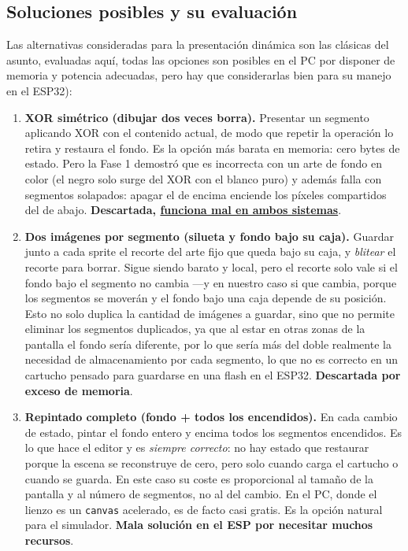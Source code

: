 \subsection{Soluciones posibles y su evaluación}
\label{subsec:SolucionesBorrado}

Las alternativas consideradas para la presentación dinámica son las clásicas del asunto, evaluadas aquí, todas las opciones son posibles en el PC por disponer de memoria y potencia adecuadas, pero hay que considerarlas bien para su manejo en el ESP32):

\begin{enumerate}
	\item \textbf{XOR simétrico (dibujar dos veces borra).} Presentar un segmento aplicando XOR con el contenido actual, de modo que repetir la operación lo retira y restaura el fondo. Es la opción más barata en memoria: cero bytes de estado. Pero la Fase 1 demostró que es incorrecta con un arte de fondo en color (el negro solo surge del XOR con el blanco puro) y además falla con segmentos solapados: apagar el de encima enciende los píxeles compartidos del de abajo. \textbf{Descartada, \underline{funciona mal en ambos sistemas}}.
	
	\item \textbf{Dos imágenes por segmento (silueta y fondo bajo su caja).} Guardar junto a cada sprite el recorte del arte fijo que queda bajo su caja, y \emph{blitear} el recorte para borrar. Sigue siendo barato y local, pero el recorte solo vale si el fondo bajo el segmento no cambia ---y en nuestro caso si que cambia, porque los segmentos se moverán y el fondo bajo una caja depende de su posición. Esto no solo duplica la cantidad de imágenes a guardar, sino que no permite eliminar los segmentos duplicados, ya que al estar en otras zonas de la pantalla el fondo sería diferente, por lo que sería más del doble realmente la necesidad de almacenamiento por cada segmento, lo que no es correcto en un cartucho pensado para guardarse en una flash en el ESP32. \textbf{Descartada por exceso de memoria}.
	
	\item \textbf{Repintado completo (fondo + todos los encendidos).} En cada cambio de estado, pintar el fondo entero y encima todos los segmentos encendidos. Es lo que hace el editor y es \emph{siempre correcto}: no hay estado que restaurar porque la escena se reconstruye de cero, pero solo cuando carga el cartucho o cuando se guarda. En este caso su coste es proporcional al tamaño de la pantalla y al número de segmentos, no al del cambio. En el PC, donde el lienzo es un \texttt{canvas} acelerado, es de facto casi gratis. Es la opción natural para el simulador. \textbf{Mala solución en el ESP por necesitar muchos recursos}.
	

\end{enumerate}
